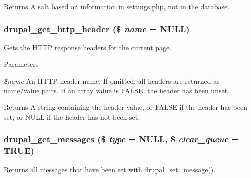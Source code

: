 \begin{DoxyReturn}{Returns}
A salt based on information in \hyperlink{settings_8php}{settings.php}, not in the database. 
\end{DoxyReturn}
\hypertarget{bootstrap_8inc_a159cce492ef9bed6e8a1dd33227fd11e}{
\subsubsection[{drupal\_\-get\_\-http\_\-header}]{\setlength{\rightskip}{0pt plus 5cm}drupal\_\-get\_\-http\_\-header (\$ {\em name} = {\ttfamily NULL})}}
\label{bootstrap_8inc_a159cce492ef9bed6e8a1dd33227fd11e}
Gets the HTTP response headers for the current page.


\begin{DoxyParams}{Parameters}
\item[{\em \$name}]An HTTP header name. If omitted, all headers are returned as name/value pairs. If an array value is FALSE, the header has been unset.\end{DoxyParams}
\begin{DoxyReturn}{Returns}
A string containing the header value, or FALSE if the header has been set, or NULL if the header has not been set. 
\end{DoxyReturn}
\hypertarget{bootstrap_8inc_a2c9915d030bad8c5bacf6de25e6fd14c}{
\subsubsection[{drupal\_\-get\_\-messages}]{\setlength{\rightskip}{0pt plus 5cm}drupal\_\-get\_\-messages (\$ {\em type} = {\ttfamily NULL}, \/  \$ {\em clear\_\-queue} = {\ttfamily TRUE})}}
\label{bootstrap_8inc_a2c9915d030bad8c5bacf6de25e6fd14c}
Returns all messages that have been set with \hyperlink{bootstrap_8inc_ad9223d86c7b08b1288274ce211d9bfa6}{drupal\_\-set\_\-message()}.


